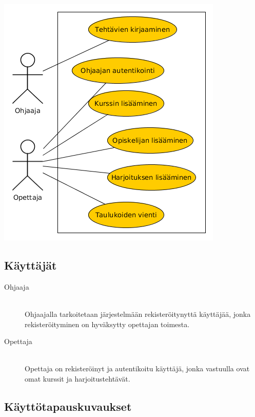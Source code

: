 \documentclass[a4paper,12pt, titlepage]{article}
\begin{document}
\includegraphics[scale=0.75]{kayttotapauskaavio}

\subsection{Käyttäjät}

\begin{description}
	\item[Ohjaaja] \hfill \\
	Ohjaajalla tarkoitetaan järjestelmään rekisteröitynyttä käyttäjää,
	jonka rekisteröityminen on hyväksytty opettajan toimesta.
	\item[Opettaja] \hfill \\
	Opettaja on rekisteröinyt ja autentikoitu käyttäjä, jonka vastuulla
	ovat omat kurssit ja harjoitustehtävät.
\end{description}

\subsection{Käyttötapauskuvaukset}
\end{document}
